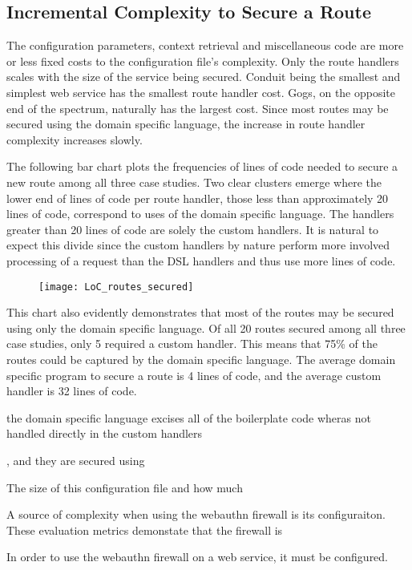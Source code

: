 \subsection{Incremental Complexity to Secure a Route}

The configuration parameters, context retrieval and miscellaneous code are more or less fixed costs to the configuration file's complexity. Only the route handlers scales with the size of the service being secured. Conduit being the smallest and simplest web service has the smallest route handler cost. Gogs, on the opposite end of the spectrum, naturally has the largest cost. Since most routes may be secured using the domain specific language, the increase in route handler complexity increases slowly.

The following bar chart plots the frequencies of lines of code needed to secure a new route among all three case studies. Two clear clusters emerge where the lower end of lines of code per route handler, those less than approximately 20 lines of code, correspond to uses of the domain specific language. The handlers greater than 20 lines of code are solely the custom handlers. It is natural to expect this divide since the custom handlers by nature perform more involved processing of a request than the DSL handlers and thus use more lines of code.

\begin{figure}[h]
  \centering
  \texttt{[image: LoC\_routes\_secured]}
\end{figure}

This chart also evidently demonstrates that most of the routes may be secured using only the domain specific language. Of all 20 routes secured among all three case studies, only 5 required a custom handler. This means that 75\% of the routes could be captured by the domain specific language. The average domain specific program to secure a route is 4 lines of code, and the average custom handler is 32 lines of code.

\iffalse
 the domain specific language excises all of the boilerplate code wheras not handled directly in the custom handlers

, and they are secured using

The size of this configuration file and how much

A source of complexity when using the webauthn firewall is its configuraiton. These evaluation metrics demonstate that the firewall is 

In order to use the webauthn firewall on a web service, it must be configured. 

